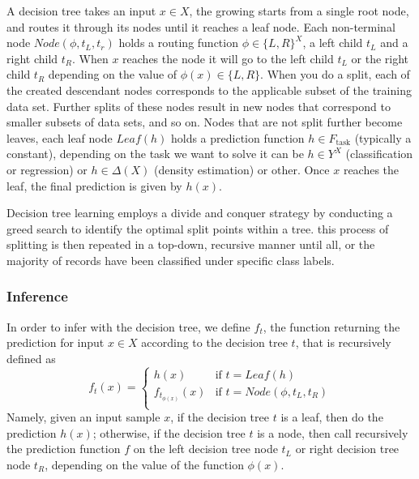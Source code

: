 A decision tree takes an input \(x \in X\), the growing starts from a single root node, and routes it through its nodes until it reaches a leaf node. Each non-terminal node \(Node(\phi, t_L, t_r)\) holds a routing function \(\phi \in \{L,R\}^X\), a left child \(t_L\) and a right child \(t_R\). When \(x\) reaches the node it will go to the left child \(t_L\) or the right child \(t_R\) depending on the value of \(\phi(x) \in \{L,R\}\). When you do a split, each of the created descendant nodes corresponds to the applicable subset of the training data set. Further splits of these nodes result in new nodes that correspond to smaller subsets of data sets, and so on. Nodes that are not split further become leaves, each leaf node \(Leaf(h)\) holds a prediction function \(h \in F_\text{task}\) (typically a constant), depending on the task we want to solve it can be \(h \in Y^X\) (classification or regression) or \(h \in \Delta(X)\) (density estimation) or other. Once \(x\) reaches the leaf, the final prediction is given by \(h(x)\).

Decision tree learning employs a divide and conquer strategy by conducting a greed search to identify the optimal split points within a tree. this process of splitting is then repeated in a top-down, recursive manner until all, or the majority of records have been classified under specific class labels.

\subsubsection{Inference}
In order to infer with the decision tree, we define \(f_t\), the function returning the prediction for input \(x \in X\) according to the decision tree \(t\), that is recursively defined as
\begin{equation}
    f_t(x) = \begin{cases}
        h(x)                 &\text{if } t = Leaf(h)\\
        f_{t_{\phi(x)}}(x)   &\text{if } t = Node(\phi,t_L,t_R)\\
    \end{cases}
\end{equation}
Namely, given an input sample \(x\), if the decision tree \(t\) is a leaf, then do the prediction \(h(x)\); otherwise, if the decision tree \(t\) is a node, then call recursively the prediction function \(f\) on the left decision tree node \(t_L\) or right decision tree node \(t_R\), depending on the value of the function \(\phi(x)\).

